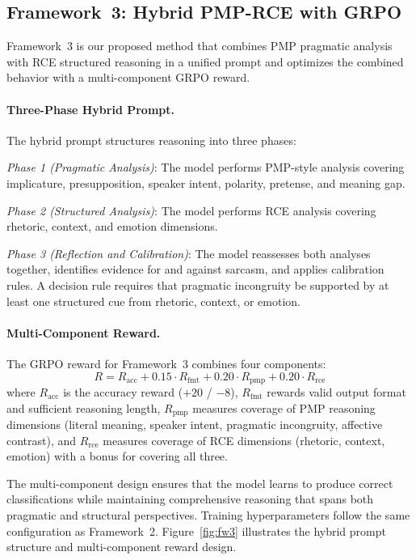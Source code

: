 \documentclass{article} %
\begin{document}
\subsection{Framework~3: Hybrid PMP-RCE with GRPO}

Framework~3 is our proposed method that combines PMP pragmatic analysis with RCE structured reasoning in a unified prompt and optimizes the combined behavior with a multi-component GRPO reward.

\paragraph{Three-Phase Hybrid Prompt.}
The hybrid prompt structures reasoning into three phases:

\textit{Phase 1 (Pragmatic Analysis)}: The model performs PMP-style analysis covering implicature, presupposition, speaker intent, polarity, pretense, and meaning gap.

\textit{Phase 2 (Structured Analysis)}: The model performs RCE analysis covering rhetoric, context, and emotion dimensions.

\textit{Phase 3 (Reflection and Calibration)}: The model reassesses both analyses together, identifies evidence for and against sarcasm, and applies calibration rules. A decision rule requires that pragmatic incongruity be supported by at least one structured cue from rhetoric, context, or emotion.

\paragraph{Multi-Component Reward.}
The GRPO reward for Framework~3 combines four components:
\begin{equation}
R = R_{\text{acc}} + 0.15 \cdot R_{\text{fmt}} + 0.20 \cdot R_{\text{pmp}} + 0.20 \cdot R_{\text{rce}}
\end{equation}
where $R_{\text{acc}}$ is the accuracy reward ($+20$ / $-8$), $R_{\text{fmt}}$ rewards valid output format and sufficient reasoning length, $R_{\text{pmp}}$ measures coverage of PMP reasoning dimensions (literal meaning, speaker intent, pragmatic incongruity, affective contrast), and $R_{\text{rce}}$ measures coverage of RCE dimensions (rhetoric, context, emotion) with a bonus for covering all three.

The multi-component design ensures that the model learns to produce correct classifications while maintaining comprehensive reasoning that spans both pragmatic and structural perspectives. Training hyperparameters follow the same configuration as Framework~2. Figure~\ref{fig:fw3} illustrates the hybrid prompt structure and multi-component reward design.
\end{document}
